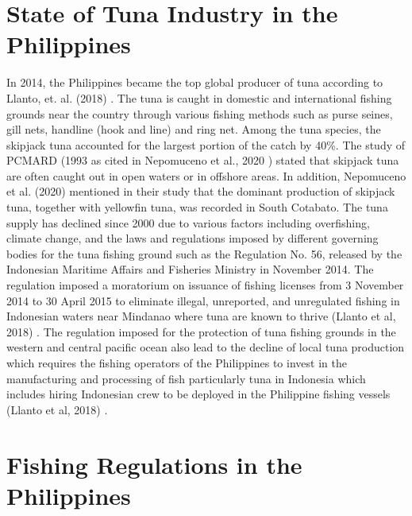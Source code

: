 
\section{State of Tuna Industry in the Philippines}
In 2014, the Philippines became the top global producer of tuna according to Llanto, et. al. (2018) \nocite{rrl-SoTIP1}. The tuna is caught in domestic and international fishing grounds near the country through various fishing methods such as purse seines, gill nets, handline (hook and line) and ring net. Among the tuna species, the skipjack tuna accounted for the largest portion of the catch by 40\%. The study of PCMARD (1993 as cited in Nepomuceno et al., 2020 ) \nocite{rrl-SoTIP2} stated that skipjack tuna are often caught out in open waters or in offshore areas. In addition, Nepomuceno et al. (2020) \nocite{rrl-SoTIP2} mentioned in their study that the dominant production of skipjack tuna, together with yellowfin tuna, was recorded in South Cotabato.
The tuna supply has declined since 2000 due to various factors including overfishing, climate change, and the laws and regulations imposed by different governing bodies for the tuna fishing ground such as the Regulation No. 56, released by the Indonesian Maritime Affairs and Fisheries Ministry in November 2014. The regulation imposed a moratorium on issuance of fishing licenses from 3 November 2014 to 30 April 2015 to eliminate illegal, unreported, and unregulated fishing in Indonesian waters near Mindanao where tuna are known to thrive (Llanto et al, 2018) \nocite{rrl-SoTIP1}. The regulation imposed for the protection of tuna fishing grounds in the western and central pacific ocean also lead to the decline of local tuna production which requires the  fishing operators of the Philippines to invest in the manufacturing and processing of fish particularly tuna in Indonesia which includes hiring Indonesian crew to be deployed in the Philippine fishing vessels (Llanto et al, 2018) \nocite{rrl-SoTIP1}.

\section{Fishing Regulations in the Philippines}

